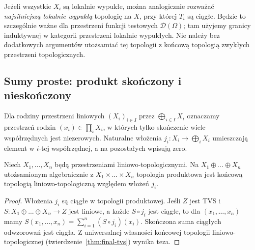 \begin{uwaga}
Jeżeli wszystkie $X_i$ są lokalnie wypukłe, można
analogicznie rozważać \emph{najsilniejszą lokalnie wypukłą}
topologię na $X$, przy której $T_i$ są ciągłe.
Będzie to szczególnie ważne dla przestrzeni funkcji
testowych $\mathcal D(\Omega)$; tam użyjemy granicy
induktywnej w kategorii przestrzeni lokalnie wypukłych.
Nie należy bez dodatkowych argumentów utożsamiać
tej topologii z końcową topologią zwykłych przestrzeni
topologicznych.
\end{uwaga}

\subsection{Sumy proste: produkt skończony i nieskończony}

\begin{definicja}
Dla rodziny przestrzeni liniowych $(X_i)_{i\in I}$
przez $\bigoplus_{i\in I}X_i$ oznaczamy przestrzeń
rodzin $(x_i)\in\prod_iX_i$, w których tylko skończenie
wiele współrzędnych jest niezerowych. Naturalne włożenia
$j_i:X_i\to\bigoplus_iX_i$ umieszczają element w $i$-tej
współrzędnej, a na pozostałych wpisują zero.
\end{definicja}

\begin{twierdzenie}
Niech $X_1,\dots,X_n$ będą przestrzeniami liniowo-topologicznymi.
Na $X_1\oplus\dots\oplus X_n$ utożsamionym algebraicznie
z $X_1\times\dots\times X_n$ topologia produktowa jest
końcową topologią liniowo-topologiczną względem włożeń $j_i$.
\end{twierdzenie}
\begin{proof}
Włożenia $j_i$ są ciągłe w topologii produktowej.
Jeśli $Z$ jest TVS i $S:X_1\oplus\dots\oplus X_n\to Z$
jest liniowe, a każde $S\circ j_i$ jest ciągłe,
to dla $(x_1,\dots,x_n)$ mamy
$S(x_1,\dots,x_n)=\sum_{i=1}^n(S\circ j_i)(x_i)$.
Skończona suma ciągłych odwzorowań jest ciągła.
Z uniwersalnej własności końcowej topologii
liniowo-topologicznej (twierdzenie~\ref{thm:final-tvs})
wynika teza.
\end{proof}

